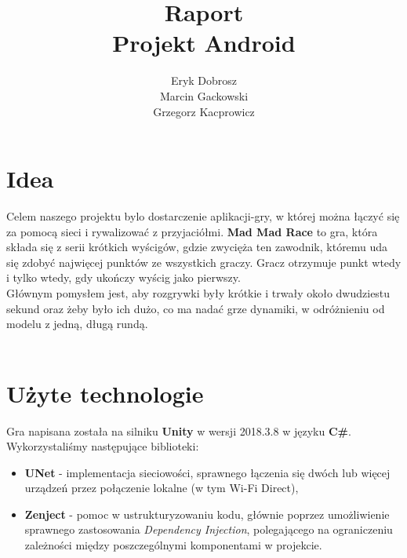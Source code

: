 \documentclass[]{report}
\begin{document}
\title{Raport\\
	\large Projekt Android}
\author{Eryk Dobrosz \\
	Marcin Gackowski \\
	Grzegorz Kacprowicz}

{\let\newpage\relax\maketitle}


\chapter*{Idea}
\quad Celem naszego projektu bylo dostarczenie aplikacji-gry, w której można łączyć się za pomocą sieci i rywalizować z przyjaciółmi. \textbf{Mad Mad Race} to gra, która składa się z serii krótkich wyścigów, gdzie zwycięża ten zawodnik, któremu uda się zdobyć najwięcej punktów ze wszystkich graczy. Gracz otrzymuje punkt wtedy i tylko wtedy, gdy ukończy wyścig jako pierwszy. \\
Głównym pomysłem jest, aby rozgrywki były krótkie i trwały około dwudziestu sekund oraz żeby było ich dużo, co ma nadać grze dynamiki, w odróżnieniu od modelu z jedną, długą rundą.\\\\


\chapter*{Użyte technologie}
\quad Gra napisana została na silniku \textbf{Unity} w wersji 2018.3.8 w języku \textbf{C\#}. Wykorzystaliśmy następujące biblioteki:
\begin{itemize}
	\item \textbf{UNet} - implementacja sieciowości, sprawnego łączenia się dwóch lub więcej urządzeń przez połączenie lokalne (w tym Wi-Fi Direct),
	\item \textbf{Zenject} - pomoc w ustrukturyzowaniu kodu, głównie poprzez umożliwienie sprawnego zastosowania \textit{Dependency Injection}, polegającego na ograniczeniu zależności między poszczególnymi komponentami w projekcie.
\end{itemize}
\end{document}

